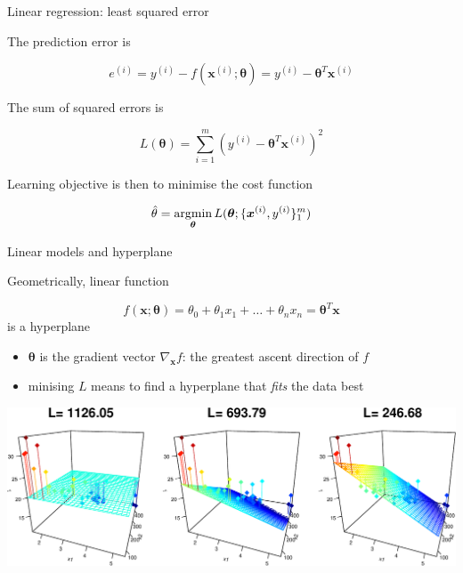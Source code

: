 \documentclass[ignorenonframetext,]{beamer}
\providecommand{\tightlist}{%
  \setlength{\itemsep}{0pt}\setlength{\parskip}{0pt}}
\newcommand{\vv}[1]{\boldsymbol{#1}}
\newcommand{\argmin}{\operatornamewithlimits{argmin}}
\begin{document}
\begin{frame}{Linear regression: least squared error}
\protect\hypertarget{linear-regression-least-squared-error}{}

The prediction error is

\[e^{(i)} = y^{(i)} - f(\vv{x}^{(i)}; \vv{\theta}) = y^{(i)} - \vv{\theta}^T\vv{x}^{(i)}\]

The sum of squared errors is

\[L(\vv{\theta}) = \sum_{i=1}^m (y^{(i)} - \vv{\theta}^T\vv{x}^{(i)})^2\]

Learning objective is then to minimise the cost function

\[\hat{\theta} = \argmin_{\vv{\theta}} L(\vv{\theta}; \{\vv{x}^{(i)}, y^{(i)}\}_1^m)\]

\end{frame}

\begin{frame}{Linear models and hyperplane}
\protect\hypertarget{linear-models-and-hyperplane}{}

Geometrically, linear function

\[f(\vv{x}; \vv{\theta}) = \theta_0 + \theta_1  x_{1} + \ldots +\theta_{n} x_n = \vv{\theta}^T\vv{x}\]
is a hyperplane

\begin{itemize}
\tightlist
\item
  \(\vv{\theta}\) is the gradient vector \(\nabla_{\vv{x}} f\): the
  greatest ascent direction of \(f\)
\item
  minising \(L\) means to find a hyperplane that \emph{fits} the data
  best \bigskip
\end{itemize}

\begin{center}\includegraphics[width=1\linewidth]{lecture3_files/figure-beamer/unnamed-chunk-4-1} \end{center}

\end{frame}
\end{document}

